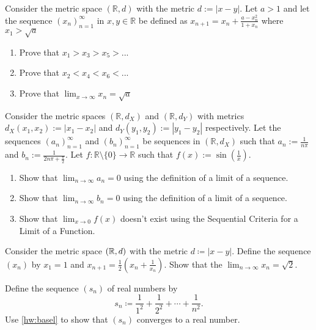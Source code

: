 \documentclass[../main.tex]{subfiles}
\begin{document}
\begin{homework}
     Consider the metric space $(\mathbb{R}, d)$ with the metric $ d := |x - y|$. Let $a > 1$ and let the sequence $(x_n)^{\infty}_{n=1}$ in  $x, y \in \mathbb{R}$ be defined as $x_{n+1} = x_n + \frac{a-x_n^2}{1+x_n}$ where $x_1 > \sqrt{a}$
    \begin{enumerate}[label=\alph*.]
        \item Prove that $x_1 > x_3 > x_5 > ...$
        \item Prove that $x_2 < x_4 < x_6 < ...$
        \item Prove that $\lim_{x \to \infty} x_n = \sqrt{a}$
    \end{enumerate}
\end{homework}

\begin{homework}
Consider the metric spaces $(\mathbb{R},d_X)$ and $(\mathbb{R},d_Y)$ with  metrics $d_X(x_1, x_2) := |x_1 - x_2|$ and $d_Y(y_1, y_2) := |y_1 - y_2|$ respectively. Let  the sequences $(a_n)_{n =1}^{\infty}$  and $(b_n)_{n =1}^{\infty}$ be sequences in $(\mathbb{R},d_X)$ such that $a_n := \frac{1}{n \pi}$ and  $b_n := \frac{1}{2n \pi + \frac{\pi}{2}}$. Let  $f: \mathbb{R} \setminus \{0\} \rightarrow \mathbb{R}$ such that $f(x) := \sin(\frac{1}{x})$.
 
    \begin{enumerate}[label=\alph*.]
        \item  Show that $\lim_{n \rightarrow \infty} a_n = 0$ using the definition of a limit of a sequence.
        \item Show that $\lim_{n \rightarrow \infty} b_n = 0$ using the definition of a limit of a sequence.
        \item  Show that $\lim_{x \rightarrow 0} f(x)$ doesn't exist using the Sequential Criteria for a Limit of a Function. 
    \end{enumerate}

\end{homework}

\begin{homework}
    Consider the metric space $(\mathbb R,d)$ with the metric $d\coloneqq|x-y|$. Define the sequence $(x_n)$ by $x_1=1$ and $x_{n+1}=\frac12\left(x_n+\frac1{x_n}\right)$. Show that the $\lim_{n\to\infty}x_n=\sqrt2$.
\end{homework}

\begin{homework}
    Define the sequence $(s_n)$ of real numbers by
    \[s_n\coloneqq\frac1{1^2}+\frac1{2^2}+\cdots+\frac1{n^2}.\]
    Use \autoref{hw:basel} to show that $(s_n)$ converges to a real number.
\end{homework}
\end{document}
